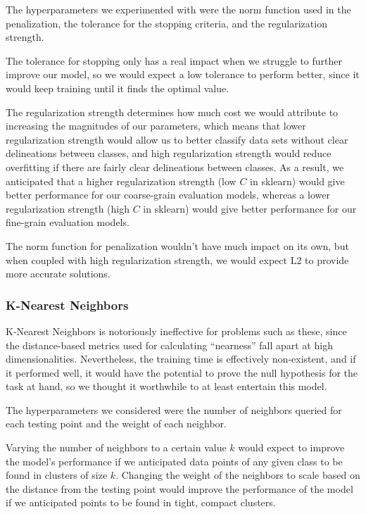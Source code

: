 \documentclass[conference]{IEEEtran}
\begin{document}
The hyperparameters we experimented with were the norm function used in the penalization, the tolerance for the stopping criteria, and the regularization strength.

The tolerance for stopping only has a real impact when we struggle to further improve our model, so we would expect a low tolerance to perform better, since it would keep training until it finds the optimal value.

The regularization strength determines how much cost we would attribute to increasing the magnitudes of our parameters, which means that lower regularization strength would allow us to better classify data sets without clear delineations between classes, and high regularization strength would reduce overfitting if there are fairly clear delineations between classes. As a result, we anticipated that a higher regularization strength (low $C$ in sklearn) would give better performance for our coarse-grain evaluation models, whereas a lower regularization strength (high $C$ in sklearn) would give better performance for our fine-grain evaluation models.

The norm function for penalization wouldn't have much impact on its own, but when coupled with high regularization strength, we would expect L2 to provide more accurate solutions.

\subsubsection{K-Nearest Neighbors}

K-Nearest Neighbors is notoriously ineffective for problems such as these, since the distance-based metrics used for calculating ``nearness'' fall apart at high dimensionalities. Nevertheless, the training time is effectively non-existent, and if it performed well, it would have the potential to prove the null hypothesis for the task at hand, so we thought it worthwhile to at least entertain this model.

The hyperparameters we considered were the number of neighbors queried for each testing point and the weight of each neighbor. 

Varying the number of neighbors to a certain value $k$ would expect to improve the model's performance if we anticipated data points of any given class to be found in clusters of size $k$. Changing the weight of the neighbors to scale based on the distance from the testing point would improve the performance of the model if we anticipated points to be found in tight, compact clusters.
\end{document}
